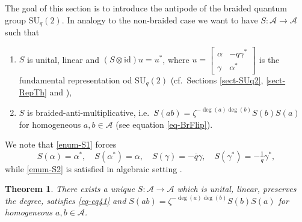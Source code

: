 \documentclass[12pt,reqno,a4paper]{amsart}
\newtheorem{theorem}[proposition]{Theorem}
\theoremstyle{definition}
\newcommand{\id}{\mathrm{id}}
\newcommand{\tens}{\otimes}
\newcommand{\cA}{\mathscr{A}}
\newcommand{\SU}{\mathrm{SU}}
\numberwithin{equation}{section}
\begin{document}
The goal of this section is to introduce the antipode of the braided quantum group $\SU_q(2)$. In analogy to the non-braided case we want to have $S\colon\cA\to\cA$ such that
\begin{enumerate}
\item\label{enum-S1} $S$ is unital, linear and $(S\tens\id)u=u^*$, where $u=\left[\begin{smallmatrix}\alpha&-q\gamma^*\\\gamma&\alpha^* \end{smallmatrix}\right]$ is the fundamental representation od $\SU_q(2)$ (cf.~Sections \ref{sect-SUq2}, \ref{sect-RepTh} and \cite[Section 5]{BraidedPodlesSpheres}),
\item\label{enum-S2} $S$ is braided-anti-multiplicative, i.e.~$S(ab)=\zeta^{-\deg(a)\deg(b)}S(b)S(a)$ for homogeneous $a,b\in\cA$ (see equation \eqref{eq-BrFlip}).
\end{enumerate}
We note that \eqref{enum-S1} forces
\begin{equation}\label{eq-eq41}
S(\alpha)=\alpha^*,\quad
S(\alpha^*)=\alpha,\quad
S(\gamma)=-\overline{q}\gamma,\quad
S(\gamma^*)=-\tfrac{1}{q}\gamma^*,
\end{equation}
while \eqref{enum-S2} is satisfied in algebraic setting \cite[Proposition 3.2.12]{HeckenbergerSchneider}.

\begin{theorem}\label{thm-prop6}
There exists a unique $S\colon\cA\to\cA$ which is unital, linear, preserves the degree, satisfies \eqref{eq-eq41} and $S(ab)=\zeta^{-\deg(a)\deg(b)} S(b)S(a)$ for homogeneous $a,b\in\cA$.
\end{theorem}
\end{document}
